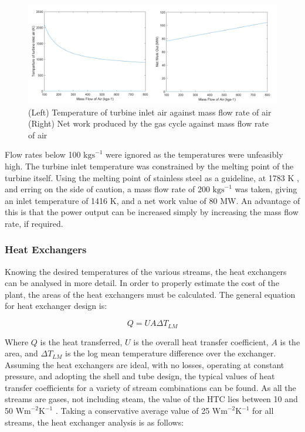 \documentclass{article}
\begin{document}
\begin{figure}[h!]
    \centering
    \includegraphics[scale=0.6]{t3_and_nw_vs_mass_flow_final.png}
    \caption{(Left) Temperature of turbine inlet air against mass flow rate of air\\ (Right) Net work produced by the gas cycle against mass flow rate of air}
    \label{LMfig:gascycleMATLAB}
\end{figure}


Flow rates below 100 $\text{kgs}^{-1}$ were ignored as the temperatures were unfeasibly high. The turbine inlet temperature was constrained by the melting point of the turbine itself. Using the melting point of stainless steel as a guideline, at 1783 K \cite{LM16}, and erring on the side of caution, a mass flow rate of 200 $\text{kgs}^{-1}$ was taken, giving an inlet temperature of 1416 K, and a net work value of 80 MW. An advantage of this is that the power output can be increased simply by increasing the mass flow rate, if required.






\subsubsection{Heat Exchangers}
    
    Knowing the desired temperatures of the various streams, the heat exchangers can be analysed in more detail. In order to properly estimate the cost of the plant, the areas of the heat exchangers must be calculated. The general equation for heat exchanger design is:
    
\begin{equation}
Q=UA\Delta T_{LM}						
\end{equation}

Where $Q$ is the heat transferred, $U$ is the overall heat transfer coefficient, $A$ is the area, and $\Delta T_{LM}$ is the log mean temperature difference over the exchanger. Assuming the heat exchangers are ideal, with no losses, operating at constant pressure, and adopting the shell and tube design, the typical values of heat transfer coefficients for a variety of stream combinations can be found. As all the streams are gases, not including steam, the value of the HTC lies between 10 and 50 $\text{Wm}^{-2} \text{K}^{-1}$ \cite{LM18}. Taking a conservative average value of 25 $\text{Wm}^{-2}\text{K}^{-1}$ for all streams, the heat exchanger analysis is as follows:
\end{document}
